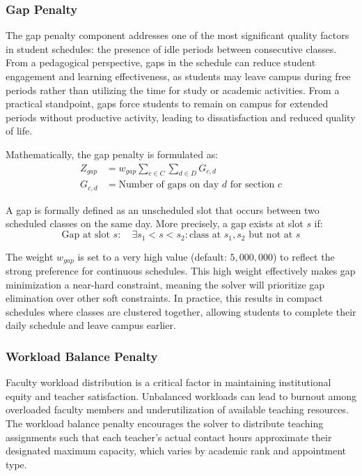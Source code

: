 \documentclass[12pt,a4paper]{article}
\begin{document}
\subsubsection{Gap Penalty}

The gap penalty component addresses one of the most significant quality factors in student schedules: the presence of idle periods between consecutive classes. From a pedagogical perspective, gaps in the schedule can reduce student engagement and learning effectiveness, as students may leave campus during free periods rather than utilizing the time for study or academic activities. From a practical standpoint, gaps force students to remain on campus for extended periods without productive activity, leading to dissatisfaction and reduced quality of life.

Mathematically, the gap penalty is formulated as:
\begin{align}
Z_{gap} &= w_{gap} \sum_{c \in C} \sum_{d \in D} G_{c,d} \\
G_{c,d} &= \text{Number of gaps on day } d \text{ for section } c
\end{align}

A gap is formally defined as an unscheduled slot that occurs between two scheduled classes on the same day. More precisely, a gap exists at slot $s$ if:
\begin{equation}
\text{Gap at slot } s: \quad \exists s_1 < s < s_2 : \text{class at } s_1, s_2 \text{ but not at } s
\end{equation}

The weight $w_{gap}$ is set to a very high value (default: $5{,}000{,}000$) to reflect the strong preference for continuous schedules. This high weight effectively makes gap minimization a near-hard constraint, meaning the solver will prioritize gap elimination over other soft constraints. In practice, this results in compact schedules where classes are clustered together, allowing students to complete their daily schedule and leave campus earlier.

\subsubsection{Workload Balance Penalty}

Faculty workload distribution is a critical factor in maintaining institutional equity and teacher satisfaction. Unbalanced workloads can lead to burnout among overloaded faculty members and underutilization of available teaching resources. The workload balance penalty encourages the solver to distribute teaching assignments such that each teacher's actual contact hours approximate their designated maximum capacity, which varies by academic rank and appointment type.
\end{document}
